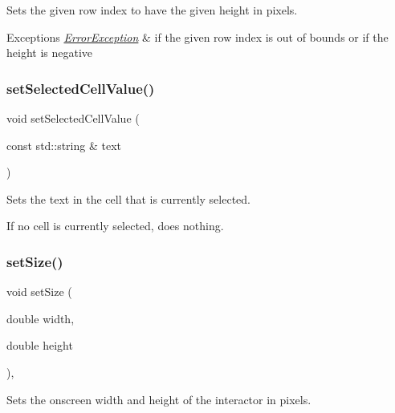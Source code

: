 Sets the given row index to have the given height in pixels. 


\begin{DoxyExceptions}{Exceptions}
{\em \mbox{\hyperlink{classErrorException}{Error\+Exception}}} & if the given row index is out of bounds or if the height is negative \\
\hline
\end{DoxyExceptions}
\mbox{\label{classGTable_a3120b24ea5aaa17d8a7192742c00bcfb}} 
\subsubsection{\texorpdfstring{set\+Selected\+Cell\+Value()}{setSelectedCellValue()}}
{\footnotesize\ttfamily void set\+Selected\+Cell\+Value (\begin{DoxyParamCaption}\item[{const std\+::string \&}]{text }\end{DoxyParamCaption})\hspace{0.3cm}{\ttfamily [virtual]}}



Sets the text in the cell that is currently selected. 

If no cell is currently selected, does nothing. \mbox{\label{classGInteractor_aca25d49481f9bf5fc8f7df4c086c4ce7}} 
\subsubsection{\texorpdfstring{set\+Size()}{setSize()}\hspace{0.1cm}{\footnotesize\ttfamily [1/2]}}
{\footnotesize\ttfamily void set\+Size (\begin{DoxyParamCaption}\item[{double}]{width,  }\item[{double}]{height }\end{DoxyParamCaption})\hspace{0.3cm}{\ttfamily [virtual]}, {\ttfamily [inherited]}}



Sets the onscreen width and height of the interactor in pixels. 


